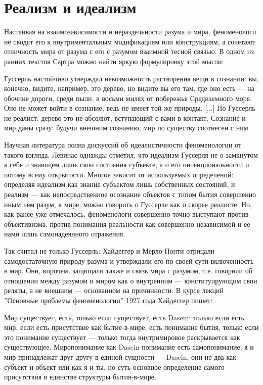 \documentclass[11pt]{book}
\begin{document}
\section{Реализм и идеализм}

Настаивая на взаимозависимости и нераздельности разума и мира, феноменологи не сводят его к внутриментальным модификациям или конструкциям, а сочетают отличность мира от разума с его с разумом взаимной тесной связью. В одном из ранних текстов Сартра можно найти яркую формулировку этой мысли:

\smallskip
{}\relax
{}\relax

Гуссерль настойчиво утверждал невозможность растворения вещи в сознании: вы, конечно, видите, например, это дерево, но видите вы его там, где оно есть --- на обочине дороги, среди пыли, в восьми милях от побережья Средиземного моря. Оно не может войти в сознание, ведь не имеет той же природы. [...] Но Гуссерль не реалист: дерево это не абсолют, вступающий с вами в контакт. Сознание и мир даны сразу: будучи внешним сознанию, мир по существу соотнесен с ним.

\relax
{}\relax
\smallskip

Научная литература полна дискуссий об идеалистичности феноменологии от такого взгляда. Левинас однажды отметил, что идеализм Гуссерля не о замкнутом в себе и знающем лишь свои состояния субъекте, а о его интенциональности и потому всему открытости. Многое зависит от используемых определений: определяя идеализм как знание субъектом лишь собственных состояний, и реализм --- как непосредственное осознание объектов с типом бытия совершенно иным чем разум, в мире, можно говорить о Гуссерле как о скорее реалисте. Но, как ранее уже отмечалось, феноменологи совершенно точно выступают против объективизма, против понимания реальности как совершенно независимой и ее нами лишь самонадеянного отражения.

Так считал не только Гуссерль: Хайдеггер и Мерло-Понти отрицали самодостаточную природу разума и утверждали его по своей сути включенность в мир. Они, впрочем, защищали также и связь мира с разумом, т.е. говорили об отношении между разумом и миром как о внутренним --- конституирующим свои реляты, а не внешним --- основанном на причинности. В курсе лекций ''Основные проблемы феноменологии'' 1927 года Хайдеггер пишет:

\smallskip
{}\relax
{}\relax

Мир существует, есть, только если существует, есть Dasein: только если есть мир, если есть присутствие как бытие-в-мире, есть понимание бытия, только если это понимание существует --- только тогда внутримировое раскрывается как существующее. Миропонимание как Dasein-понимание есть самопонимание, я и мир принадлежат друг другу в единой сущности --- Dasein, они не два как субъект и объект или как я и ты, но суть основное определение самого присутствия в единстве структуры бытия-в-мире.
\end{document}
